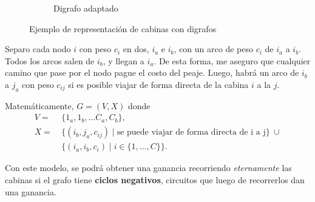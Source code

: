 \documentclass[12pt, a4paper]{report}
\theoremstyle{definition} %
\begin{document}
\begin{enumerate}[a)]
\begin{figure}[H]
\begin{subfigure}[b]{0.4\textwidth}
        \caption{Digrafo adaptado}
    \end{subfigure}
    \caption{Ejemplo de representación de cabinas con digrafos}
    \label{5:adaptado}
\end{figure}

Separo cada nodo $i$ con peso $c_i$ en dos, $i_a$ e $i_b$, con un arco de peso $c_i$ de $i_a$ a $i_b$. Todos los arcos salen de $i_b$, y llegan a $i_a$. De esta forma, me aseguro que cualquier camino que pase por el nodo pague el costo del peaje. Luego, habrá un arco de $i_b$ a $j_a$ con peso $c_{ij}$ si es posible viajar de forma directa de la cabina $i$ a la $j$.

Matemáticamente, $G = (V, X)$ donde
\begin{align*}
    V = \ &\{ 1_a, 1_b, \ldots C_a, C_b\},\\
    X = \ &\{ (i_b, j_a, c_{ij}) \mid \text{se puede viajar de forma directa de i a j} \}\ \cup\\
      &\{ (i_a, i_b, c_i) \mid i \in \{1, \ldots, C\}\}.
\end{align*}

Con este modelo, se podrá obtener una ganancia recorriendo \textit{eternamente} las cabinas si el grafo tiene \textbf{ciclos negativos}, circuitos que luego de recorrerlos dan una ganancia.

\begin{figure}[H]
    \centering
    \begin{subfigure}[b]{0.4\textwidth}
        \centering
\end{subfigure}
\end{figure}
\end{enumerate}
\end{document}
